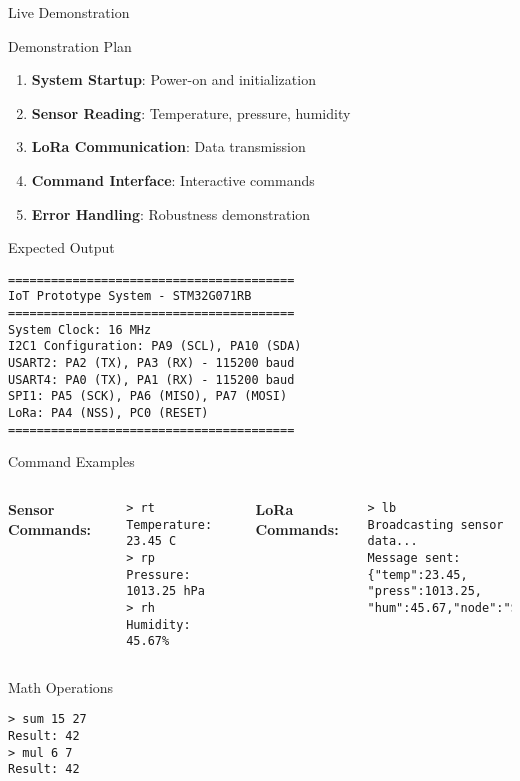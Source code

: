 \documentclass[aspectratio=169]{beamer}
\begin{document}
\begin{frame}[fragile]{Live Demonstration}
\begin{block}{Demonstration Plan}
\begin{enumerate}
    \item \textbf{System Startup}: Power-on and initialization
    \item \textbf{Sensor Reading}: Temperature, pressure, humidity
    \item \textbf{LoRa Communication}: Data transmission
    \item \textbf{Command Interface}: Interactive commands
    \item \textbf{Error Handling}: Robustness demonstration
\end{enumerate}
\end{block}

\begin{block}{Expected Output}
\begin{verbatim}
========================================
IoT Prototype System - STM32G071RB
========================================
System Clock: 16 MHz
I2C1 Configuration: PA9 (SCL), PA10 (SDA)
USART2: PA2 (TX), PA3 (RX) - 115200 baud
USART4: PA0 (TX), PA1 (RX) - 115200 baud
SPI1: PA5 (SCK), PA6 (MISO), PA7 (MOSI)
LoRa: PA4 (NSS), PC0 (RESET)
========================================
\end{verbatim}
\end{block}
\end{frame}

\begin{frame}[fragile]{Command Examples}
\begin{columns}
\textbf{Sensor Commands:}
\begin{verbatim}
> rt
Temperature: 23.45 C
> rp
Pressure: 1013.25 hPa
> rh
Humidity: 45.67%
\end{verbatim}

\textbf{LoRa Commands:}
\begin{verbatim}
> lb
Broadcasting sensor data...
Message sent: {"temp":23.45,
"press":1013.25,
"hum":45.67,"node":"STM32"}
\end{verbatim}
\end{columns}

\begin{block}{Math Operations}
\begin{verbatim}
> sum 15 27
Result: 42
> mul 6 7
Result: 42
\end{verbatim}
\end{block}
\end{frame}
\end{document}
